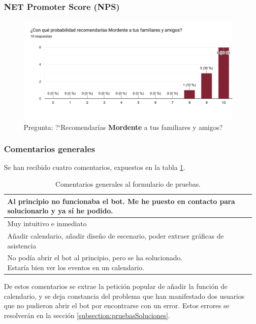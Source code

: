 \subsubsection{NET Promoter Score (NPS)}

\begin{figure}[h]
\centering
\includegraphics[width=\textwidth]{imagenes/pruebas/recomendacion.png}
\caption{Pregunta: ?`Recomendarías \textbf{Mordente} a tus familiares y amigos?}
\label{fig:graficoNetScore}
\end{figure}

\subsubsection{Comentarios generales}

Se han recibido cuatro comentarios, expuestos en la tabla \ref{tab:respuestasComentarios}.

\begin{table}[h!]
\centering
\begin{tabularx}{\textwidth}{|X|} 
 \hline
 Al principio no funcionaba el bot. Me he puesto en contacto para solucionarlo y ya sí he podido. \\ 
 \hline
 Muy intuitivo e inmediato \\
 \hline
 Añadir calendario, añadir diseño de escenario, poder extraer gráficas de asistencia \\
 \hline
 \makecell[l]{No podía abrir el bot al principio, pero se ha solucionado. \\ Estaría bien ver los eventos en un calendario.} \\
 \hline
\end{tabularx}
\caption{Comentarios generales al formulario de pruebas.}
\label{tab:respuestasComentarios}
\end{table}

De estos comentarios se extrae la petición popular de añadir la función de calendario, y se deja constancia del problema que han manifestado dos usuarios que no pudieron abrir el bot por encontrarse con un error. Estos errores se resolverán en la sección \ref{subsection:pruebasSoluciones}.

